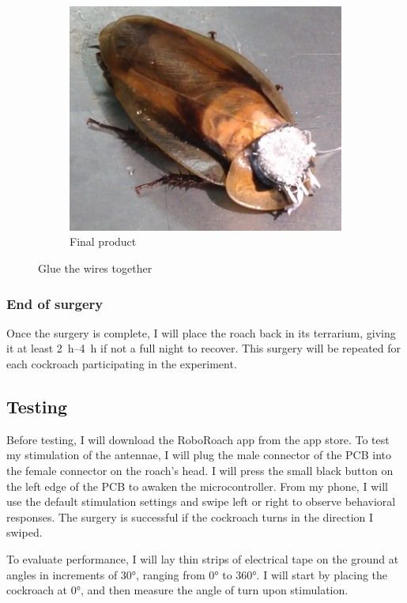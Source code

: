 \begin{figure}[ht!]
\begin{subfigure}{.5\textwidth}
    \includegraphics[scale=0.3]{Surgery Photos/gluewires2.jpg}
    \caption{Final product}
    \label{fig:gluewires2}
    \end{subfigure}
\caption{Glue the wires together}
\label{fig:connector}
\end{figure}

\subsubsection{End of surgery}
Once the surgery is complete, I will place the roach back in its terrarium, giving it at least \SIrange{2}{4}{\hour} if not a full night to recover. This surgery will be repeated for each cockroach participating in the experiment.


\subsection{Testing}
Before testing, I will download the RoboRoach app from the app store. To test my stimulation of the antennae, I will plug the male connector of the PCB into the female connector on the roach's head. I will press the small black button on the
left edge of the PCB to awaken the microcontroller. From my phone, I will use the default stimulation settings and swipe left or right to observe behavioral responses. The surgery is successful if the cockroach turns in the direction I swiped.

To evaluate performance, I will lay thin strips of electrical tape on the ground at angles in increments of \ang{30}, ranging from \ang{0} to \ang{360}. I will start by placing the cockroach at \ang{0}, and then measure the angle of turn upon stimulation. 






















